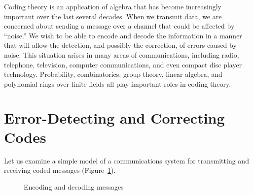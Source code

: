  

Coding theory is an application of algebra that has become
increasingly important over the last several decades. When we transmit
data, we are concerned about sending a message over a channel that
could be affected by ``noise.'' We wish to be able to encode and
decode the information in a manner that will allow the detection, and
possibly the correction, of errors caused by noise. This situation
arises in many areas of communications, including radio, telephone,
television, computer communications, and even compact disc player
technology. Probability, combinatorics, group theory, linear algebra,
and polynomial rings over finite fields all play important roles in
coding theory.  
 

\section{Error-Detecting and Correcting Codes}

Let us examine a simple model of a communications system for
transmitting and receiving coded messages (Figure~\ref{encoding}).  

\begin{figure}[htb] %
\begin{center}

\caption{Encoding and decoding messages}
\end{center}
\label{encoding}
\end{figure}

